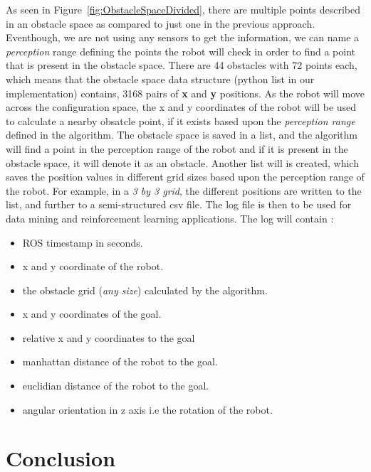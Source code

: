 As seen in Figure~\ref{fig:ObstacleSpaceDivided}, there are multiple points described in an obstacle space as compared to just one in the previous approach.
Eventhough, we are not using any sensors to get the information, we can name a \textit{perception} range defining the points the robot will check in order to find a point that is present in the obstacle space.
There are 44 obstacles with 72 points each, which means that the obstacle space data structure (python list in our implementation) contains, 3168 pairs of \textbf{x} and \textbf{y} positions.
As the robot will move across the configuration space, the x and y coordinates of the robot will be used to calculate a nearby obsatcle point, if it exists based upon the \textit{perception range} defined in the algorithm.
The obstacle space is saved in a list, and the algorithm will find a point in the perception range of the robot and if it is present in the obstacle space, it will denote it as an obstacle.
Another list will is created, which saves the position values in different grid sizes based upon the perception range of the robot. For example, in a \textit{3 by 3 grid}, the different positions are written to the list, and further to a semi-structured csv file. The log file is then to be used for data mining and reinforcement learning applications.
The log will contain :  

\begin{itemize}
    \item ROS timestamp in seconds.
    \item x and y coordinate of the robot.
    \item the obstacle grid (\textit{any size}) calculated by the algorithm.
    \item x and y coordinates of the goal.
    \item relative x and y coordinates to the goal
    \item manhattan distance of the robot to the goal.
    \item euclidian distance of the robot to the goal.
    \item angular orientation in z axis i.e the rotation of the robot.
\end{itemize}

\section{Conclusion}

